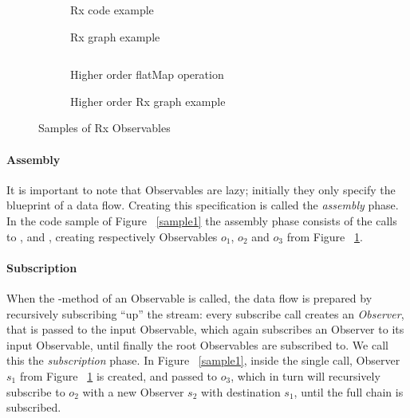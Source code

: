 \begin{figure}[ht!]
    \centering

    \begin{subfigure}[t]
        {\columnwidth} \inputminted[tabsize=2]{javascript}{listings/sample1.js}
        \par
        \bigskip
        \caption{Rx code example}%
        \label{sample1}
        \par
        \medskip
        
        \caption{Rx graph example}%
        \label{chaincreate}
    \end{subfigure}
    \begin{subfigure}[t]
        {\columnwidth} \inputminted[tabsize=2]{javascript}{listings/sample3.js}
        \caption{Higher order flatMap operation}%
        \label{sample3}
        \par
        \medskip
        
        \caption{Higher order Rx graph example}%
        \label{chainhigher}
    \end{subfigure}

    \caption{Samples of Rx Observables}

\end{figure}

\paragraph{Assembly} It is important to note that Observables are lazy;
initially they only specify the blueprint of a data flow.  Creating this
specification is called the \emph{assembly} phase.  In the code sample
of Figure~%
\ref{sample1} the assembly phase consists of the calls to ,
 and , creating respectively Observables $ o_1 $,
$ o_2 $ and $ o_3 $ from Figure~%
\ref{chaincreate}.

\paragraph{Subscription} When the -method of an
Observable is called, the data flow is prepared by recursively
subscribing ``up'' the stream:  every subscribe call creates an \emph{Observer},
that is passed to the input Observable, which again subscribes an
Observer to its input Observable, until finally the root Observables are
subscribed to.  We call this the \emph{subscription} phase.  In Figure~%
\ref{sample1}, inside the single  call, Observer $ s_1 $
from Figure~%
\ref{chaincreate} is created, and passed to $ o_3 $, which in turn will
recursively subscribe to $ o_2 $ with a new Observer $ s_2 $ with
destination $ s_1 $, until the full chain is subscribed.

